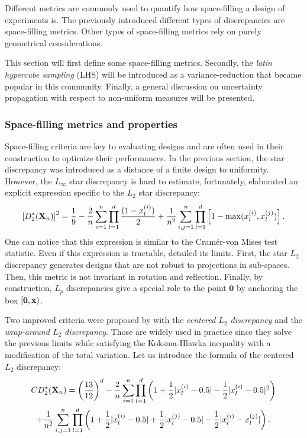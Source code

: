 Different metrics are commonly used to quantify how space-filling a design of experiments is. 
The previously introduced different types of discrepancies are space-filling metrics.
Other types of space-filling metrics rely on purely geometrical considerations.  

This section will first define some space-filling metrics.
Secondly, the \textit{latin hypercube sampling} (LHS) will be introduced as a variance-reduction that became popular in this community. 
Finally, a general discussion on uncertainty propagation with respect to non-uniform measures will be presented.

\subsubsection{Space-filling metrics and properties}
Space-filling criteria are key to evaluating designs and are often used in their construction to optimize their performances. 
In the previous section, the star discrepancy was introduced as a distance of a finite design to uniformity.
However, the $L_\infty$ star discrepancy is hard to estimate, fortunately, \citet{warnock_1972} elaborated an explicit expression specific to the $L_2$ star discrepancy: 
\begin{equation}
    \left[D^*_2({\bf X}_n)\right]^2 = \frac19 - \frac2n \sum_{i=1}^{n} \prod_{l=1}^{d} \frac{(1-x_l^{(i)})}{2} + \frac{1}{n^2}\sum_{i,j=1}^{n} \prod_{l=1}^{d} \left[1 - \max(x_l^{(i)}, x_l^{(j)})\right].
\end{equation}
One can notice that this expression is similar to the Cramér-von Mises test statistic. 
Even if this expression is tractable, \citet{fang_liu_2018} detailed its limits. 
First, the star $L_2$ discrepancy generates designs that are not robust to projections in sub-spaces. 
Then, this metric is not invariant in rotation and reflection. 
Finally, by construction, $L_p$ discrepancies give a special role to the point $\mathbf{0}$ by anchoring the box $[\mathbf{0}, {\bf x})$.

Two improved criteria were proposed by \citet{hickernell_1998} with the \textit{centered $L_2$ discrepancy} and the \textit{wrap-around $L_2$ discrepancy}.
Those are widely used in practice since they solve the previous limits while satisfying the Koksma-Hlawka inequality with a modification of the total variation.
Let us introduce the formula of the centered $L_2$ discrepancy:
\begin{multline} CD^*_2({\bf X}_n)  = \left(\frac{13}{12}\right)^{d} - \frac{2}{n} \sum_{i=1}^{n} \prod_{l=1}^{d} \left( 1 + \frac{1}{2} |x_l^{(i)} - 0.5| - \frac{1}{2} |x_l^{(i)} - 0.5|^2 \right)\\
    + \frac{1}{n^2} \sum_{i,j=1}^{n} \prod_{l=1}^{d} \left( 1 + \frac{1}{2} |x_l^{(i)} - 0.5| + \frac{1}{2} |x_l^{(j)} - 0.5| - \frac{1}{2} |x_l^{(i)} - x_l^{(j)}| \right).
\end{multline}

